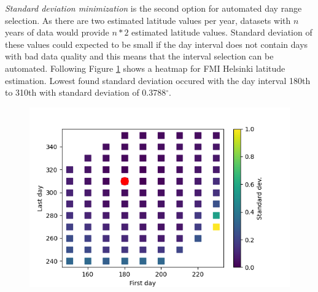 \textit{Standard deviation minimization} is the second option for automated day range selection. As there are two estimated latitude values per year, datasets with $n$ years of data would provide $n*2$ estimated latitude values. Standard deviation of these values could expected to be small if the day interval does not contain days with bad data quality and this means that the interval selection can be automated. Following Figure \ref{fig_heatmap3d2} shows a heatmap for FMI Helsinki latitude estimation. Lowest found standard deviation occured with the day interval 180th to 310th with standard deviation of 0.3788$^\circ$.






\begin{figure}[]
\centering
\includegraphics[width=0.8\linewidth]{pics/std_dev_helsinki_latitude}
\label{fig_heatmap3d2}
\end{figure}

